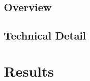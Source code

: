 \documentclass[11pt,a4paper]{article}
\begin{document}
\subsection{Overview}


\subsection{Technical Detail}


\section{Results}

%
%

\end{document}
